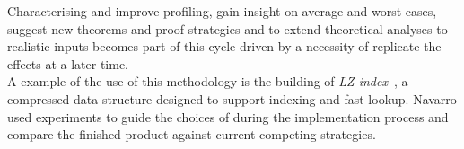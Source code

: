 Characterising and improve profiling, gain insight on average and worst cases, suggest new theorems and proof strategies and to extend theoretical analyses to realistic inputs becomes part of this cycle driven by a necessity of replicate the effects at a later time.\\

A example of the use of this methodology is the building of \textit{LZ-index}~\cite{Navarro_2009}, a compressed data structure designed to support indexing and fast lookup. Navarro used experiments to guide the choices of during the implementation process and compare the finished product against current competing strategies.\\
